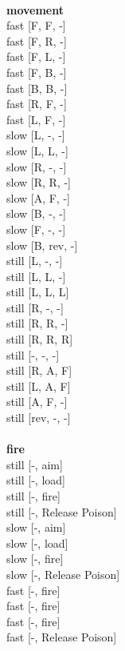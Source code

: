 \ \\ {\bf movement } \\
fast [F, F, -] \\
fast [F, R, -] \\
fast [F, L, -] \\
fast [F, B, -] \\
fast [B, B, -] \\
fast [R, F, -] \\
fast [L, F, -] \\
slow [L, -, -] \\
slow [L, L, -] \\
slow [R, -, -] \\
slow [R, R, -] \\
slow [A, F, -] \\
slow [B, -, -] \\
slow [F, -, -] \\
slow [B, rev, -] \\
still [L, -, -] \\
still [L, L, -] \\
still [L, L, L] \\
still [R, -, -] \\
still [R, R, -] \\
still [R, R, R] \\
still [-, -, -] \\
still [R, A, F] \\
still [L, A, F] \\
still [A, F, -] \\
still [rev, -, -] \\
\ \\ {\bf fire } \\
still [-, aim] \\
still [-, load] \\
still [-, fire] \\
still [-, Release Poison] \\
slow [-, aim] \\
slow [-, load] \\
slow [-, fire] \\
slow [-, Release Poison] \\
fast [-, fire] \\
fast [-, fire] \\
fast [-, fire] \\
fast [-, Release Poison] \\


